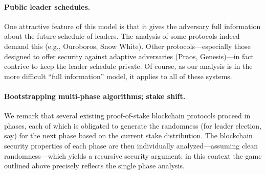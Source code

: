   \paragraph{Public leader schedules.} One attractive feature of this
  model is that it gives the adversary full information about the future
  schedule of leaders. The analysis of some protocols indeed demand this
  (e.g., Ouroboros, Snow White). Other protocols---especially those
  designed to offer security against adaptive adversaries (Praos,
  Genesis)---in fact contrive to keep the leader schedule private. Of
  course, as our analysis is in the more difficult ``full information''
  model, it applies to all of these systems.

  \paragraph{Bootstrapping multi-phase algorithms; stake shift.} We remark that
  several existing proof-of-stake blockchain protocols proceed in
  phases, each of which is obligated to generate the randomness (for
  leader election, say) for the next phase based on the current stake
  distribution. The blockchain security properties of each phase are
  then individually analyzed---assuming clean randomness---which yields
  a recursive security argument; in this context the game outlined above
  precisely reflects the single phase analysis.






